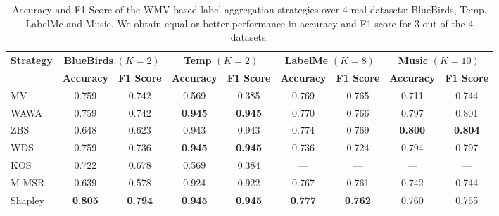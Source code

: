 \documentclass{cap2024}
\begin{document}
\begin{table}[h]
  \centering
  \caption{Accuracy and F1 Score of the WMV-based label aggregation strategies over 4 real datasets: BlueBirds, Temp, LabelMe and Music. We obtain equal or better performance in accuracy and F1 score for 3 out of the 4 datasets.\\ }
  \label{tab:scores}

  \footnotesize{
  \begin{tabular}{l|cc|cc|cc|cc}
  \hline
  \multirow{2}{*}{\textbf{Strategy}} & \multicolumn{2}{c|}{\textbf{BlueBirds} $(K=2)$} & \multicolumn{2}{c|}{\textbf{Temp} $(K=2)$} & \multicolumn{2}{c|}{\textbf{LabelMe} $(K=8)$} & \multicolumn{2}{c}{\textbf{Music} $(K=10)$} \\
  \cline{2-9}
   & \textbf{Accuracy} & \textbf{F1 Score} & \textbf{Accuracy} & \textbf{F1 Score} & \textbf{Accuracy} & \textbf{F1 Score} & \textbf{Accuracy} & \textbf{F1 Score} \\
  \hline
  MV    & 0.759 & 0.742 & 0.569 & 0.385 & 0.769 & 0.765 & 0.711 & 0.744 \\
  WAWA  & 0.759 & 0.742 & \textbf{0.945} & \textbf{0.945} & 0.770 & 0.766 & 0.797 & 0.801 \\
  ZBS   & 0.648 & 0.623 & 0.943 & 0.943 & 0.774 & 0.769 & \textbf{0.800} & \textbf{0.804} \\
  WDS   & 0.759 & 0.736 & \textbf{0.945} & \textbf{0.945} & 0.736 & 0.724 & 0.794 & 0.797 \\
  KOS   & 0.722 & 0.678 & 0.569 & 0.384 & --- & --- & --- & --- \\
  M-MSR & 0.639 & 0.578 & 0.924 & 0.922 & 0.767 & 0.761 & 0.742 & 0.744 \\
  \rowcolor{lightgray} Shapley & \textbf{0.805}& \textbf{0.794}& \textbf{0.945} & \textbf{0.945} & \textbf{0.777} & \textbf{0.762} & 0.760 & 0.765  \\

  \hline
  \end{tabular}
  }
  \end{table}

\end{document}
